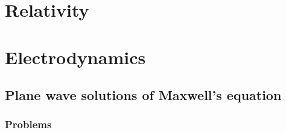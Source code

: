 %
%
\part{Relativity}
   
   
   
   
   
   
   
   

\part{Electrodynamics}
   
   
   
   
   
   
   
   
   
   
   
   
   
   
   
   
   
   
   
   
   
   
   
   

   \chapter{Plane wave solutions of Maxwell's equation}
      
      \section{Problems}
         
